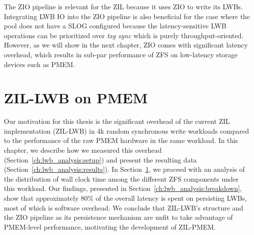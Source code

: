 \documentclass[12pt,a4paper,twoside]{book}
\begin{document}
The ZIO pipeline is relevant for the ZIL because it uses ZIO to write its LWBs.
Integrating LWB IO into the ZIO pipeline is also beneficial for the case where the pool does not have a SLOG configured because the latency-sensitive LWB operations can be prioritized over \textit{txg sync} which is purely throughput-oriented.
However, as we will show in the next chapter, ZIO comes with significant latency overhead, which results in sub-par performance of ZFS on low-latency storage devices such as PMEM.

\chapter{ZIL-LWB on PMEM}\label{ch:lwb_analysis}
Our motivation for this thesis is the significant overhead of the current ZIL implementation (ZIL-LWB) in 4k random synchronous write workloads compared to the performance of the raw PMEM hardware in the same workload.
In this chapter, we describe how we measured this overhead (Section~\ref{ch:lwb_analysis:setup}) and present the resulting data (Section~\ref{ch:lwb_analysis:results}).
In Section~\ref{ch:lwb_analysis}, we proceed with an analysis of the distribution of wall clock time among the different ZFS components under this workload.
Our findings, presented in Section~\ref{ch:lwb_analysis:breakdown}, show that approximately 80\% of the overall latency is spent on persisting LWBs, most of which is software overhead.
We conclude that ZIL-LWB's structure and the ZIO pipeline as its persistence mechanism are unfit to take advantage of PMEM-level performance, motivating the development of ZIL-PMEM.
\end{document}

